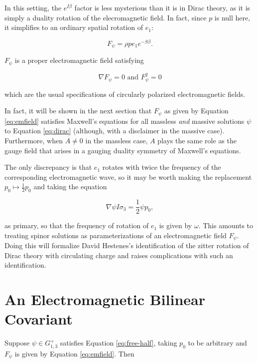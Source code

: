 \documentclass[twocolumn]{article}
\begin{document}
    In this setting, the $e^{I \beta}$ factor is less mysterious than it is in Dirac theory, as it is simply a duality rotation of the elecromagnetic field. In fact, since $p$ is null here, it simplifies to an ordinary spatial rotation of $e_1$:

    \begin{equation}
      F_\psi = \rho p e_1 e^{-S \beta}.
    \end{equation}

    $F_\psi$ is a proper electromagnetic field satisfying

    \begin{equation}
      \nabla F_\psi = 0 \text { and } F_\psi^2 = 0
    \end{equation}

    which are the usual specifications of circularly polarized electromagnetic fields.

    In fact, it will be shown in the next section that $F_\psi$ as given by Equation \ref{eq:emfield} satisfies Maxwell's equations for all massless \emph{and} massive solutions $\psi$ to Equation \ref{eq:dirac} (although, with a disclaimer in the massive case). Furthermore, when $A \not= 0$ in the massless case, $A$ plays the same role as the gauge field that arises in a gauging duality symmetry of Maxwell's equations.

    The only discrepancy is that $e_1$ rotates with twice the frequency of the corresponding electromagnetic wave, so it may be worth making the replacement $p_0 \mapsto \frac{1}{2} p_0$ and taking the equation

    \begin{equation}
      \nabla \psi I \sigma_3 = \frac{1}{2} \psi p_0,\label{eq:free-half}
    \end{equation}

    as primary, so that the frequency of rotation of $e_1$ is given by $\omega$. This amounts to treating spinor solutions as parameterizations of an electromagnetic field $F_\psi$. Doing this will formalize David Hestenes's identification of the zitter rotation of Dirac theory with circulating charge and raises complications with such an identification.

    \section{An Electromagnetic Bilinear Covariant}\label{electromagnetism}

    Suppose $\psi \in G_{1,3}^+$ satisfies Equation \ref{eq:free-half}, taking $p_0$ to be arbitrary and $F_\psi$ is given by Equation \ref{eq:emfield}. Then
\end{document}
